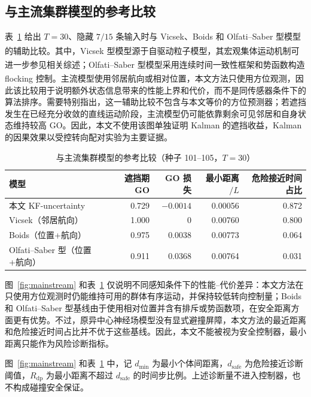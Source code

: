 \documentclass[UTF8,fontset=windows,11pt]{ctexart}
\newcommand{\upcite}[1]{\textsuperscript{\cite{#1}}}
\begin{document}
\subsection{与主流集群模型的参考比较}

表~\ref{tab:mainstream} 给出 $T=30$、隐藏 $7/15$ 条输入时与 Vicsek、Boids 和 Olfati--Saber 型模型的辅助比较。其中，Vicsek 型模型源于自驱动粒子模型\upcite{Vicsek1995}，其宏观集体运动机制可进一步参见相关综述\upcite{Vicsek2012}；Olfati--Saber 型模型采用连续时间一致性框架和势函数构造 flocking 控制\upcite{OlfatiSaber2006}。主流模型使用邻居航向或相对位置，本文方法只使用方位观测，因此该比较用于说明额外状态信息带来的性能上界和代价，而不是同传感器条件下的算法排序。需要特别指出，这一辅助比较不包含与本文等价的方位预测器；若遮挡发生在已经充分收敛的直线运动阶段，主流模型仍可能依靠剩余可见邻居和自身状态维持较高 GO。因此，本文不使用该图单独证明 Kalman 的遮挡收益，Kalman 的因果效果以受控转向配对实验为主要证据。

\begin{table}[htbp]
 \centering
 \small
 \caption{与主流集群模型的参考比较（种子 101--105，$T=30$）}
 \label{tab:mainstream}
 \begin{tabular}{lrrrr}
 \toprule
 模型 & 遮挡期 GO & GO 损失 & 最小距离$/L$ & 危险接近时间占比\\
 \midrule
 本文 KF-uncertainty & 0.729 & $-0.0014$ & 0.00056 & 0.872\\
 Vicsek（邻居航向） & 1.000 & 0 & 0.00760 & 0.800\\
 Boids（位置+航向） & 0.975 & 0.0038 & 0.00773 & 0.064\\
 Olfati--Saber 型（位置+航向） & 0.911 & 0.0368 & 0.00764 & 0.031\\
 \bottomrule
 \end{tabular}
\end{table}

图~\ref{fig:mainstream} 和表~\ref{tab:mainstream} 仅说明不同感知条件下的性能--代价差异：本文方法在只使用方位观测时仍能维持可用的群体有序运动，并保持较低转向控制量；Boids 和 Olfati--Saber 型基线由于使用相对位置并含有排斥或势函数项，在安全距离方面更有优势。不过，原异中心神经场模型没有显式避撞屏障，本文方法的最近距离和危险接近时间占比并不优于这些基线。因此，本文不能被视为安全控制器，最小距离只能作为风险诊断指标。

图~\ref{fig:mainstream} 和表~\ref{tab:mainstream} 中，记 $d_{\min}$ 为最小个体间距离，$d_{\mathrm{safe}}$ 为危险接近诊断阈值，$R_{\mathrm{dp}}$ 为最小距离不超过 $d_{\mathrm{safe}}$ 的时间步比例。上述诊断量不进入控制器，也不构成碰撞安全保证。
\end{document}
